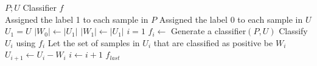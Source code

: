 \documentclass{article}
\begin{document}
\begin{algorithm}[!h]
\renewcommand{\algorithmicrequire}{\textbf{Input:}} %
\renewcommand{\algorithmicensure}{\textbf{Output:}} %
	\caption{PU-LEA NB} %
	\begin{algorithmic}[1] %
	    \REQUIRE
	    $P;U$
	    \ENSURE
	    Classifier $f$ \\
	    \STATE Assigned the label 1 to each sample in $P$
		\STATE Assigned the label 0 to each sample in $U$
	    \STATE $U_1=U$
	    \STATE $|W_0|\leftarrow |U_1|$
	    \STATE $|W_1|\leftarrow |U_1|$
	    \STATE $i=1$
		\STATE $f_i\leftarrow$ Generate a classifier$(P,U)$
		\STATE Classify $U_i$ using $f_i$
		\STATE Let the set of samples in $U_i$ that are classified as positive be $W_i$
		\STATE $U_{i+1}\leftarrow U_i-W_i$
		\STATE $i\leftarrow i+1$
		\ENDWHILE
		\RETURN $f_{last}$
	\end{algorithmic}
\end{algorithm}
\end{document}

